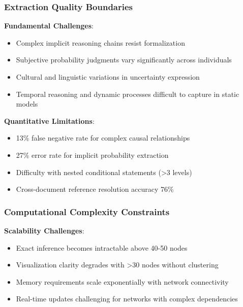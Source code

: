 \documentclass[
  11pt,
  letterpaper,
]{book}
\providecommand{\tightlist}{%
  \setlength{\itemsep}{0pt}\setlength{\parskip}{0pt}}
\begin{document}
\subsubsection{Extraction Quality
Boundaries}\label{sec-extraction-boundaries}

\textbf{Fundamental Challenges}:

\begin{itemize}
\tightlist
\item
  Complex implicit reasoning chains resist formalization
\item
  Subjective probability judgments vary significantly across individuals
\item
  Cultural and linguistic variations in uncertainty expression
\item
  Temporal reasoning and dynamic processes difficult to capture in
  static models
\end{itemize}

\textbf{Quantitative Limitations}:

\begin{itemize}
\tightlist
\item
  13\% false negative rate for complex causal relationships
\item
  27\% error rate for implicit probability extraction
\item
  Difficulty with nested conditional statements (\textgreater3 levels)
\item
  Cross-document reference resolution accuracy 76\%
\end{itemize}

\subsubsection{Computational Complexity
Constraints}\label{sec-computational-constraints}

\textbf{Scalability Challenges}:

\begin{itemize}
\tightlist
\item
  Exact inference becomes intractable above 40-50 nodes
\item
  Visualization clarity degrades with \textgreater30 nodes without
  clustering
\item
  Memory requirements scale exponentially with network connectivity
\item
  Real-time updates challenging for networks with complex dependencies
\end{itemize}
\end{document}

